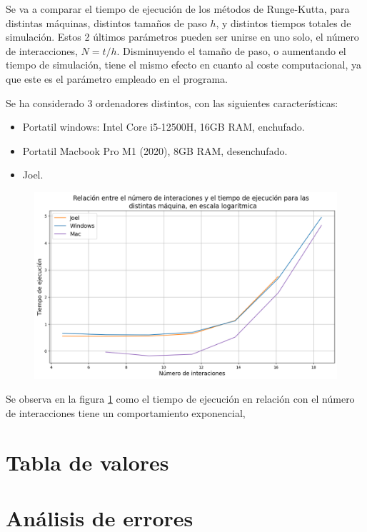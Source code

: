 \documentclass[11pt, twoside]{article} %
\begin{document}
Se va a comparar el tiempo de ejecución de los métodos de Runge-Kutta, para 
distintas máquinas, distintos tamaños de paso $h$, y distintos tiempos totales
de simulación. Estos 2 últimos parámetros pueden ser unirse en uno solo, 
el número de interacciones, $N = t/h$. Disminuyendo el tamaño de paso, o 
aumentando el tiempo de simulación, tiene el mismo efecto en cuanto al coste
computacional, ya que este es el parámetro empleado en el programa.

Se ha considerado 3 ordenadores distintos, con las siguientes características:
\begin{itemize}
    \item Portatil windows: Intel Core i5-12500H, 16GB RAM, enchufado.
    \item Portatil Macbook Pro M1 (2020), 8GB RAM, desenchufado.
    \item Joel.
\end{itemize}

\begin{figure}[h!]
    \centering
    \includegraphics[width=\linewidth]{plots/optimizacion.png}
    \caption{}
    \label{fig:optimizacion}
\end{figure}

Se observa en la figura \ref{fig:optimizacion} como el tiempo de ejecución
en relación con el número de interacciones tiene un comportamiento exponencial,


\newpage

\appendix

\section{Tabla de valores}


\newpage

\section{Análisis de errores}
\end{document}
